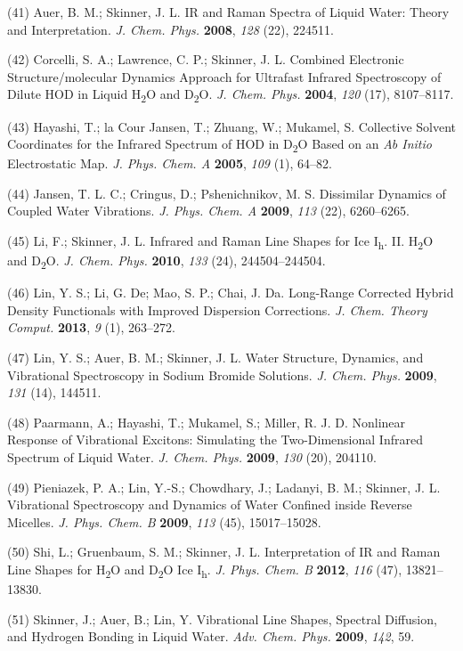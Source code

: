 \documentclass[]{article}
\begin{document}
(41) Auer, B. M.; Skinner, J. L. IR and Raman Spectra of Liquid Water:
Theory and Interpretation. \emph{J. Chem. Phys.} \textbf{2008},
\emph{128} (22), 224511.

(42) Corcelli, S. A.; Lawrence, C. P.; Skinner, J. L. Combined
Electronic Structure/molecular Dynamics Approach for Ultrafast Infrared
Spectroscopy of Dilute HOD in Liquid H\textsubscript{2}O and
D\textsubscript{2}O. \emph{J. Chem. Phys.} \textbf{2004}, \emph{120}
(17), 8107--8117.

(43) Hayashi, T.; la Cour Jansen, T.; Zhuang, W.; Mukamel, S. Collective
Solvent Coordinates for the Infrared Spectrum of HOD in
D\textsubscript{2}O Based on an \emph{Ab Initio} Electrostatic Map.
\emph{J. Phys. Chem. A} \textbf{2005}, \emph{109} (1), 64--82.

(44) Jansen, T. L. C.; Cringus, D.; Pshenichnikov, M. S. Dissimilar
Dynamics of Coupled Water Vibrations. \emph{J. Phys. Chem. A}
\textbf{2009}, \emph{113} (22), 6260--6265.

(45) Li, F.; Skinner, J. L. Infrared and Raman Line Shapes for Ice
I\textsubscript{h}. II. H\textsubscript{2}O and D\textsubscript{2}O.
\emph{J. Chem. Phys.} \textbf{2010}, \emph{133} (24), 244504--244504.

(46) Lin, Y. S.; Li, G. De; Mao, S. P.; Chai, J. Da. Long-Range
Corrected Hybrid Density Functionals with Improved Dispersion
Corrections. \emph{J. Chem. Theory Comput.} \textbf{2013}, \emph{9} (1),
263--272.

(47) Lin, Y. S.; Auer, B. M.; Skinner, J. L. Water Structure, Dynamics,
and Vibrational Spectroscopy in Sodium Bromide Solutions. \emph{J. Chem.
Phys.} \textbf{2009}, \emph{131} (14), 144511.

(48) Paarmann, A.; Hayashi, T.; Mukamel, S.; Miller, R. J. D. Nonlinear
Response of Vibrational Excitons: Simulating the Two-Dimensional
Infrared Spectrum of Liquid Water. \emph{J. Chem. Phys.} \textbf{2009},
\emph{130} (20), 204110.

(49) Pieniazek, P. A.; Lin, Y.-S.; Chowdhary, J.; Ladanyi, B. M.;
Skinner, J. L. Vibrational Spectroscopy and Dynamics of Water Confined
inside Reverse Micelles. \emph{J. Phys. Chem. B} \textbf{2009},
\emph{113} (45), 15017--15028.

(50) Shi, L.; Gruenbaum, S. M.; Skinner, J. L. Interpretation of IR and
Raman Line Shapes for H\textsubscript{2}O and D\textsubscript{2}O Ice
I\textsubscript{h}. \emph{J. Phys. Chem. B} \textbf{2012}, \emph{116}
(47), 13821--13830.

(51) Skinner, J.; Auer, B.; Lin, Y. Vibrational Line Shapes, Spectral
Diffusion, and Hydrogen Bonding in Liquid Water. \emph{Adv. Chem. Phys.}
\textbf{2009}, \emph{142}, 59.
\end{document}
